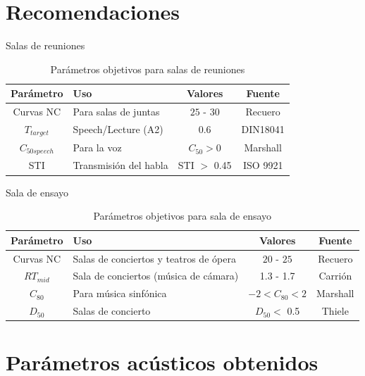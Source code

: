 \documentclass{sintefbeamer}
\begin{document}
\section{Recomendaciones}
\begin{frame}{Salas de reuniones}
    \begin{table}[H]
    \centering
    \caption{Parámetros objetivos para salas de reuniones}
    \label{tab: parametros objetivos sala de reuniones}
    \begin{tabular}{|c|l|c|c|}
    \hline
    \textbf{Parámetro} & \textbf{Uso }                 & \textbf{Valores}     & \textbf{Fuente}  \\ \hline
    Curvas NC & Para salas de juntas & $25$ - $30$ & Recuero \\ \hline
    $T_{target}$ & Speech/Lecture (A2) & 0.6 & DIN18041 \\ \hline
    $C_{50speech}$  & Para la voz &  $C_{50}>0$         &  Marshall  \\ \hline  
    STI & Transmisión del habla & STI $>$ 0.45 & ISO 9921\\ \hline
    \end{tabular}
    
\end{table}
\end{frame}
\begin{frame}{Sala de ensayo}
    \begin{table}[H]
    \centering
    \caption{Parámetros objetivos para sala de ensayo}
    \label{tab: parametros objetivos sala de ensayo}
    \begin{tabular}{|c|l|c|c|}
    \hline
    \textbf{Parámetro} & \textbf{Uso}                  & \textbf{Valores}     & \textbf{Fuente}  \\ \hline
    Curvas NC & Salas de conciertos y teatros de ópera & $20$ - $25$ & Recuero \\ \hline
    $RT_{mid}$ & Sala de conciertos (música de cámara) & 1.3 - 1.7 & Carrión \\ \hline
    $C_{80}$  & Para música sinfónica &  $-2<C_{80}<2$         &  Marshall  \\ \hline   
    $D_{50}$  & Salas de concierto         &  $D_{50}<$ 0.5         &  Thiele \\ \hline
    \end{tabular}
    
\end{table}
\end{frame}

\section{Parámetros acústicos obtenidos}
\end{document}
